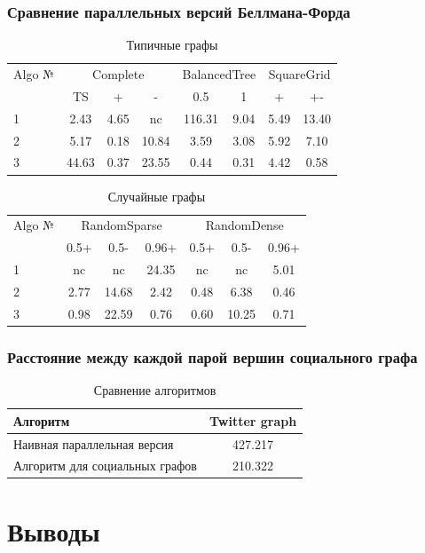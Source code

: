 \documentclass[10pt, compress]{beamer}
\begin{document}
\begin{frame}[fragile]
  \frametitle{Сравнение параллельных версий Беллмана-Форда}
\begin{table}
\centering
\begin{tabular}{l|ccc|cc|cc}  
Algo №& \multicolumn{3}{c}{Complete} & \multicolumn{2}{c}{BalancedTree} & \multicolumn{2}{c}{SquareGrid} \\
& TS & + & - & 0.5 & 1 & + & +- \\
\hline\hline
1 & 2.43 & 4.65 & nc & 116.31 & 9.04 & 5.49 & 13.40\\  
2 & 5.17 & 0.18 & 10.84 & 3.59 & 3.08 & 5.92 & 7.10  \\
3 & 44.63 & 0.37 & 23.55 & 0.44 & 0.31 & 4.42 & 0.58 \\
\end{tabular}
\caption{Типичные графы}
\label{graph_description}
\end{table}


\begin{table}
\centering
\begin{tabular}{l|ccc|ccc}  
Algo №& \multicolumn{3}{c}{RandomSparse} & \multicolumn{3}{c}{RandomDense}\\
& 0.5+  & 0.5- & 0.96+ & 0.5+ & 0.5- & 0.96+\\
\hline\hline
1 & nc & nc & 24.35 & nc & nc & 5.01 \\  
2 & 2.77 & 14.68 & 2.42 & 0.48  & 6.38  & 0.46 \\
3 & 0.98 & 22.59 & 0.76  & 0.60  & 10.25 & 0.71 \\
\end{tabular}
\caption{Случайные графы}
\label{graph_description}
\end{table}

\end{frame}


\begin{frame}[fragile]
  \frametitle{Расстояние между каждой парой вершин социального графа}

\begin{table}
\centering

\begin{tabular}{l|c}  
Алгоритм & Twitter graph\\
\hline\hline
Наивная параллельная версия & 427.217 \\  
Алгоритм для социальных графов & 210.322  \\
\hline
\end{tabular}

\caption{Сравнение алгоритмов}
\label {table:algo_floyd_comparison}
\end{table}
  
\end{frame}

\section{Выводы}


\end{document}
